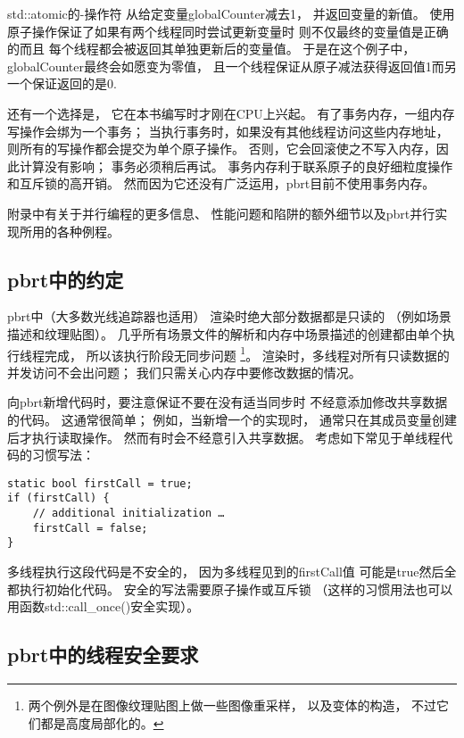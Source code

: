 {\ttfamily std::atomic}的{\ttfamily -}操作符
从给定变量{\ttfamily globalCounter}减去1，
并返回变量的新值。
使用原子操作保证了如果有两个线程同时尝试更新变量时
则不仅最终的变量值是正确的而且
每个线程都会被返回其单独更新后的变量值。
于是在这个例子中，{\ttfamily globalCounter}最终会如愿变为零值，
且一个线程保证从原子减法获得返回值1而另一个保证返回的是0.

还有一个选择是，
它在本书编写时才刚在CPU上兴起。
有了事务内存，一组内存写操作会绑为一个事务；
当执行事务时，如果没有其他线程访问这些内存地址，
则所有的写操作都会提交为单个原子操作。
否则，它会回滚使之不写入内存，因此计算没有影响；
事务必须稍后再试。
事务内存利于联系原子的良好细粒度操作和互斥锁的高开销。
然而因为它还没有广泛运用，pbrt目前不使用事务内存。

附录中有关于并行编程的更多信息、
性能问题和陷阱的额外细节以及pbrt并行实现所用的各种例程。

\subsection{pbrt中的约定}\label{sub:pbrt中的约定}
pbrt中（大多数光线追踪器也适用）
渲染时绝大部分数据都是只读的
（例如场景描述和纹理贴图）。
几乎所有场景文件的解析和内存中场景描述的创建都由单个执行线程完成，
所以该执行阶段无同步问题
\footnote{两个例外是在图像纹理贴图上做一些图像重采样，
    以及\protect{}变体的构造，
    不过它们都是高度局部化的。}。
渲染时，多线程对所有只读数据的并发访问不会出问题；
我们只需关心内存中要修改数据的情况。

向pbrt新增代码时，要注意保证不要在没有适当同步时
不经意添加修改共享数据的代码。
这通常很简单；
例如，当新增一个的实现时，
通常只在其成员变量创建后才执行读取操作。
然而有时会不经意引入共享数据。
考虑如下常见于单线程代码的习惯写法：
\begin{lstlisting}
static bool firstCall = true;
if (firstCall) {
    // additional initialization …
    firstCall = false;
}
\end{lstlisting}

多线程执行这段代码是不安全的，
因为多线程见到的{\ttfamily firstCall}值
可能是{\ttfamily true}然后全都执行初始化代码。
安全的写法需要原子操作或互斥锁
（这样的习惯用法也可以用函数{\ttfamily std::call\_once()}安全实现）。

\subsection{pbrt中的线程安全要求}

